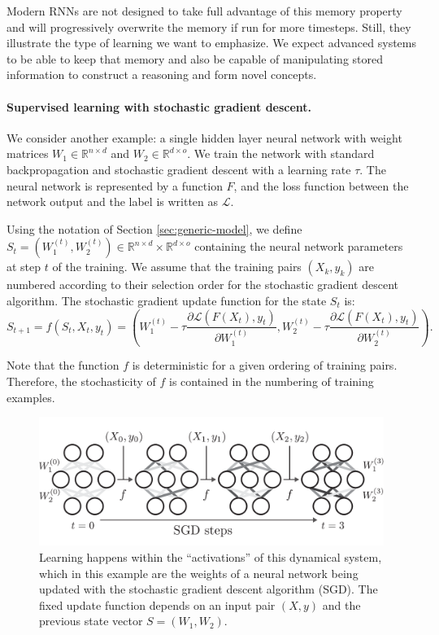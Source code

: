 Modern \acp{RNN} are not designed to take full advantage of this memory
property and will progressively overwrite the memory if run for more timesteps.
Still, they illustrate the type of learning we want to emphasize. We expect
advanced systems to be able to keep that memory and also be capable of
manipulating stored information to construct a reasoning and form novel concepts.

\paragraph{Supervised learning with stochastic gradient descent.}
\label{sec:superv-learn-with}
We consider another example: a single hidden layer neural network with weight
matrices $W_1 \in \mathbb{R}^{n \times d}$ and $W_2 \in \mathbb{R}^{d \times o}$. We train the network with
standard backpropagation and stochastic gradient descent with a learning rate $\tau$.
The neural network is represented by a function $F$, and the loss function
between the network output and the label is written as $\mathcal{L}$.

Using the notation of Section \ref{sec:generic-model}, we define
$S_{t} = \left(W_{1}^{(t)}, W_{2}^{(t)}\right) \in \mathbb{R}^{n \times d} \times \mathbb{R}^{d \times o}$
containing the neural network parameters at step $t$ of the training. We assume
that the training pairs $(X_{k}, y_{k})$ are numbered according to their
selection order for the stochastic gradient descent algorithm.
The stochastic gradient update function for the state $S_{t}$ is:
\begin{equation}
  \label{eq:supervised-learning}
  S_{t+1} = {f}(S_t, X_t, y_t) = \left(W_1^{(t)} - \tau \frac{\partial
      \mathcal{L}(F(X_t), y_t)}{\partial W_1^{(t)}}, W_2^{(t)} - \tau \frac{\partial
      \mathcal{L}(F(X_t), y_t)}{\partial W_2^{(t)}} \right).
\end{equation}

Note that the function $f$ is deterministic for a given ordering of training
pairs. Therefore, the stochasticity of $f$ is contained in the numbering of
training examples.

\begin{figure}[htbp]
  \centering
  \includegraphics[width=.9\linewidth]{figures/learning_nn.pdf}
  \caption{\label{fig:label} Learning happens within the ``activations'' of this
    dynamical system, which in this example are the weights of a neural
    network being updated with the stochastic gradient descent algorithm (SGD). 
    The fixed update function depends on an input pair $(X, y)$
    and the previous state vector $S = (W_1, W_2)$.}
\end{figure}


